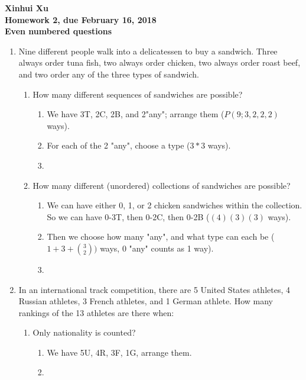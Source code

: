 \documentclass[12pt]{amsart}
\begin{document}
\begin{center}
  \bfseries
  Xinhui Xu\\
  Homework 2, due February 16, 2018\\
  Even numbered questions
\end{center}

\bigskip

\begin{enumerate}
\item  Nine different people walk into a delicatessen to buy a sandwich. Three always
order tuna fish, two always order chicken, two always order roast beef, and two
order any of the three types of sandwich.
    \begin{enumerate}
        \item How many different sequences of sandwiches are possible?
        \begin{enumerate}
            \item We have 3T, 2C, 2B, and 2"any"; arrange them ($P(9;3,2,2,2)$ ways).
            \item For each of the 2 "any", choose a type ($3*3$ ways).
            \item {}
        \end{enumerate}
        
        \item How many different (unordered) collections of sandwiches are possible?
        \begin{enumerate}
            \item We can have either 0, 1, or 2 chicken sandwiches within the collection. So we can have 0-3T, then 0-2C, then 0-2B ($(4)(3)(3)$ ways).
            \item Then we choose how many "any", and what type can each be ($1+3+\binom32)$ ways, 0 "any" counts as 1 way).
            \item {}
        \end{enumerate}
    \end{enumerate}
\item In an international track competition, there are 5 United States athletes, 4
Russian athletes, 3 French athletes, and 1 German athlete. How many rankings
of the 13 athletes are there when:
    \begin{enumerate}
        \item  Only nationality is counted?
        \begin{enumerate}
            \item We have 5U, 4R, 3F, 1G, arrange them.
            \item {}
        \end{enumerate}
        

\end{enumerate}
\end{enumerate}
\end{document}
